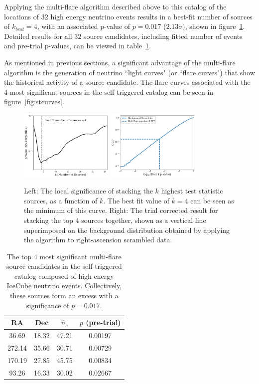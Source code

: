 Applying the multi-flare algorithm described above to this catalog of the locations of 32 high energy neutrino events results in a best-fit number of sources of $k_{best}=4$, with an associated p-value of $p=0.017$ ($2.13\sigma)$, shown in figure~\ref{fig:stresults}. Detailed results for all 32 source candidates, including fitted number of events and pre-trial p-values, can be viewed in table~\ref{tab:stresults}. 

As mentioned in previous sections, a significant advantage of the multi-flare algorithm is the generation of neutrino ``light curves" (or ``flare curves") that show the historical activity of a source candidate. The flare curves associated with the 4 most significant sources in the self-triggered catalog can be seen in figure~\ref{fig:stcurves}.

\begin{figure}[h]
\centering
\includegraphics[width=0.4\textwidth]{figs/st_pcurve.png}
\includegraphics[width=0.4\textwidth]{figs/st_obsresult.png}
\caption{Left: The local significance of stacking the $k$ highest test statistic sources, as a function of $k$. The best fit value of $k=4$ can be seen as the minimum of this curve. Right: The trial corrected result for stacking the top 4 sources together, shown as a vertical line superimposed on the background distribution obtained by applying the algorithm to right-ascension scrambled data.}
\label{fig:stresults}
\end{figure}

\begin{table}[h!]
\centering
 \begin{tabular}{||c c c c||} 
 \hline
 RA & Dec & $\hat{n}_s$ & $p$ (pre-trial) \\ [0.5ex] 
 \hline\hline
 36.69 & 18.32 & 47.21 & 0.00197 \\ 
 \hline
 272.14 & 35.66 & 30.71 & 0.00729 \\
 \hline
 170.19 & 27.85 & 45.75 & 0.00834 \\
 \hline
 93.26 & 16.33 & 30.02 & 0.02667 \\
 \hline
\end{tabular}
\caption{The top 4 most significant multi-flare source candidates in the self-triggered catalog composed of high energy IceCube neutrino events. Collectively, these sources form an excess with a significance of $p=0.017$.}
\label{tab:stresults}
\end{table}



